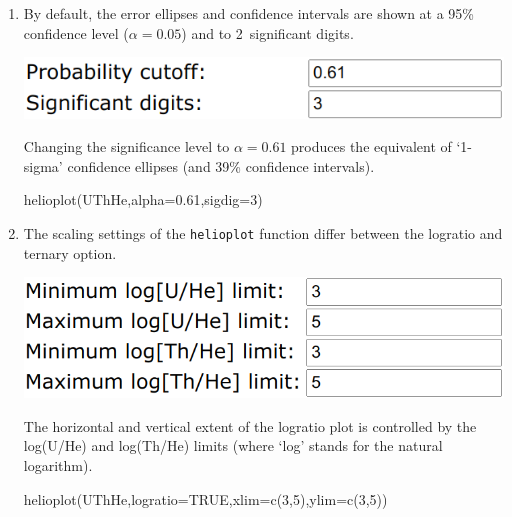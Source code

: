 \begin{refsection}
\begin{enumerate}
\item By default, the error ellipses and confidence intervals are
  shown at a 95\% confidence level ($\alpha=0.05$) and to
  2~significant digits.

\noindent\begin{minipage}[t]{.5\linewidth}
\strut\vspace*{-\baselineskip}\newline
\includegraphics[width=\linewidth]{../figures/UThHealphasigdig.png}
\end{minipage}
\begin{minipage}[t]{.5\linewidth}
  Changing the significance level to $\alpha=0.61$ produces the
  equivalent of `1-sigma' confidence ellipses (and 39\% confidence
  intervals).
\end{minipage}

\begin{console}
helioplot(UThHe,alpha=0.61,sigdig=3)
\end{console}

\item The scaling settings of the \texttt{helioplot} function differ
  between the logratio and ternary option.

\noindent\begin{minipage}[t]{.5\linewidth}
\strut\vspace*{-\baselineskip}\newline
\includegraphics[width=\linewidth]{../figures/UThHeLogratioLimits.png}
\end{minipage}
\begin{minipage}[t]{.5\linewidth}
  The horizontal and vertical extent of the logratio plot is
  controlled by the log(U/He) and log(Th/He) limits (where `log'
  stands for the natural logarithm).
\end{minipage}

\begin{console}
helioplot(UThHe,logratio=TRUE,xlim=c(3,5),ylim=c(3,5))
\end{console}


\end{enumerate}
\end{refsection}
